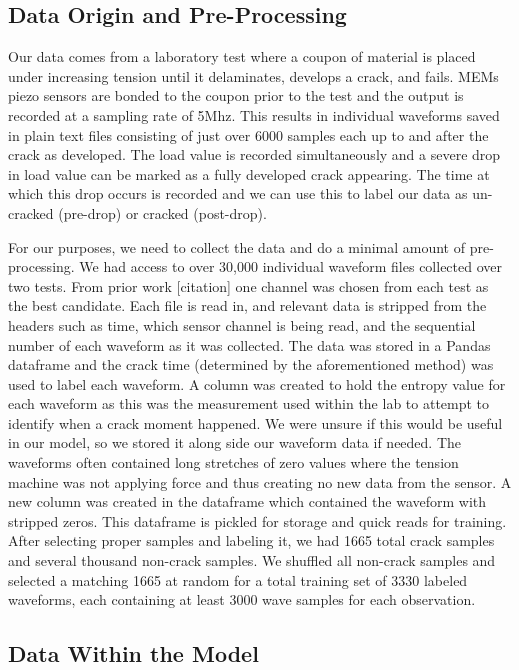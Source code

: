\documentclass[conference]{IEEEtran}
\begin{document}
\subsection{Data Origin and Pre-Processing}

Our data comes from a laboratory test where a coupon of material is placed under
increasing tension until it delaminates, develops a crack, and fails. MEMs piezo
sensors are bonded to the coupon prior to the test and the output is recorded at
a sampling rate of 5Mhz. This results in individual waveforms saved in plain text
files consisting of just over 6000 samples each up to and after the crack as
developed. The load value is recorded simultaneously and a severe drop in load
value can be marked as a fully developed crack appearing. The time at which this
drop occurs is recorded and we can use this to label our data as un-cracked
(pre-drop) or cracked (post-drop).

For our purposes, we need to collect the data and do a minimal amount of
pre-processing. We had access to over 30,000 individual waveform files collected
over two tests. From prior work [citation] one channel was chosen from each
test as the best candidate. Each file is read in, and relevant data is stripped from the
headers such as time, which sensor channel is being read, and the sequential
number of each waveform as it was collected. The data was stored in a Pandas
dataframe and the crack time (determined by the aforementioned method) was used
to label each waveform. A column was created to hold the entropy value for
each waveform as this was the measurement used within the lab to attempt to
identify when a crack moment happened. We were unsure if this would be useful
in our model, so we stored it along side our waveform data if needed. The
waveforms often contained long stretches of zero values where the tension machine
was not applying force and thus creating no new data from the sensor. A new column
was created in the dataframe which contained the waveform with stripped zeros.
This dataframe is pickled for storage and quick reads for training. After selecting
proper samples and labeling it, we had 1665 total crack samples and several thousand
non-crack samples. We shuffled all non-crack samples and selected a matching 1665
at random for a total training set of 3330 labeled waveforms, each containing at
least 3000 wave samples for each observation.

\subsection{Data Within the Model}
\end{document}
